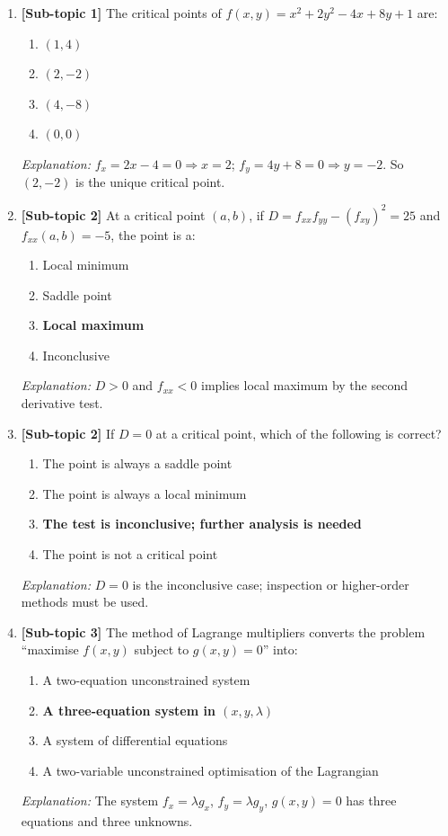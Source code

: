 \documentclass[12pt,a4paper]{article}
\begin{document}
\begin{enumerate}

  \item \textbf{[Sub-topic 1]} The critical points of $f(x,y) = x^{2} + 2y^{2} - 4x + 8y + 1$ are:
  \begin{enumerate}[label=(\Alph*)]
    \item $(1, 4)$
    \item \textbf{$(2, -2)$}
    \item $(4, -8)$
    \item $(0, 0)$
  \end{enumerate}
  \textit{Explanation:} $f_x = 2x-4 = 0 \Rightarrow x=2$; $f_y = 4y+8 = 0 \Rightarrow y=-2$. So $(2,-2)$ is the unique critical point.

  \item \textbf{[Sub-topic 2]} At a critical point $(a,b)$, if $D = f_{xx}f_{yy}-(f_{xy})^{2} = 25$ and $f_{xx}(a,b) = -5$, the point is a:
  \begin{enumerate}[label=(\Alph*)]
    \item Local minimum
    \item Saddle point
    \item \textbf{Local maximum}
    \item Inconclusive
  \end{enumerate}
  \textit{Explanation:} $D > 0$ and $f_{xx} < 0$ implies local maximum by the second derivative test.

  \item \textbf{[Sub-topic 2]} If $D = 0$ at a critical point, which of the following is correct?
  \begin{enumerate}[label=(\Alph*)]
    \item The point is always a saddle point
    \item The point is always a local minimum
    \item \textbf{The test is inconclusive; further analysis is needed}
    \item The point is not a critical point
  \end{enumerate}
  \textit{Explanation:} $D=0$ is the inconclusive case; inspection or higher-order methods must be used.

  \item \textbf{[Sub-topic 3]} The method of Lagrange multipliers converts the problem ``maximise $f(x,y)$ subject to $g(x,y)=0$'' into:
  \begin{enumerate}[label=(\Alph*)]
    \item A two-equation unconstrained system
    \item \textbf{A three-equation system in $(x,y,\lambda)$}
    \item A system of differential equations
    \item A two-variable unconstrained optimisation of the Lagrangian
  \end{enumerate}
  \textit{Explanation:} The system $f_x = \lambda g_x$, $f_y = \lambda g_y$, $g(x,y) = 0$ has three equations and three unknowns.


\end{enumerate}
\end{document}
